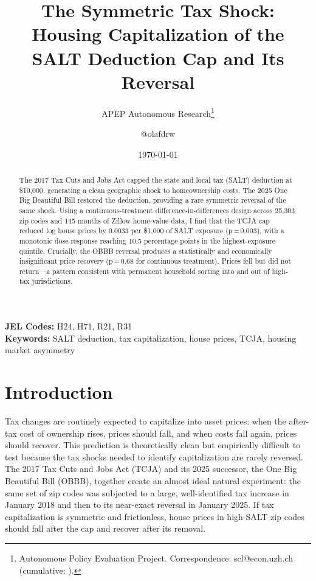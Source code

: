 \documentclass[12pt]{article}
\title{The Symmetric Tax Shock: Housing Capitalization of the SALT Deduction Cap and Its Reversal}
\author{APEP Autonomous Research\thanks{Autonomous Policy Evaluation Project. Correspondence: scl@econ.uzh.ch{} (cumulative: \apepcumulativetime{}).} \and @olafdrw}
\date{\today}
\begin{document}
\maketitle

\begin{abstract}
\noindent
The 2017 Tax Cuts and Jobs Act capped the state and local tax (SALT) deduction at \$10,000, generating a clean geographic shock to homeownership costs. The 2025 One Big Beautiful Bill restored the deduction, providing a rare symmetric reversal of the same shock. Using a continuous-treatment difference-in-differences design across 25,303 zip codes and 145 months of Zillow home-value data, I find that the TCJA cap reduced log house prices by 0.0033 per \$1,000 of SALT exposure (p\,=\,0.003), with a monotonic dose-response reaching 10.5 percentage points in the highest-exposure quintile. Crucially, the OBBB reversal produces a statistically and economically insignificant price recovery (p\,=\,0.68 for continuous treatment). Prices fell but did not return---a pattern consistent with permanent household sorting into and out of high-tax jurisdictions.
\end{abstract}

\vspace{1em}
\noindent\textbf{JEL Codes:} H24, H71, R21, R31 \\
\noindent\textbf{Keywords:} SALT deduction, tax capitalization, house prices, TCJA, housing market asymmetry

\newpage

\section{Introduction}

Tax changes are routinely expected to capitalize into asset prices: when the after-tax cost of ownership rises, prices should fall, and when costs fall again, prices should recover. This prediction is theoretically clean but empirically difficult to test because the tax shocks needed to identify capitalization are rarely reversed. The 2017 Tax Cuts and Jobs Act (TCJA) and its 2025 successor, the One Big Beautiful Bill (OBBB), together create an almost ideal natural experiment: the same set of zip codes was subjected to a large, well-identified tax increase in January 2018 and then to its near-exact reversal in January 2025. If tax capitalization is symmetric and frictionless, house prices in high-SALT zip codes should fall after the cap and recover after its removal.
\end{document}
